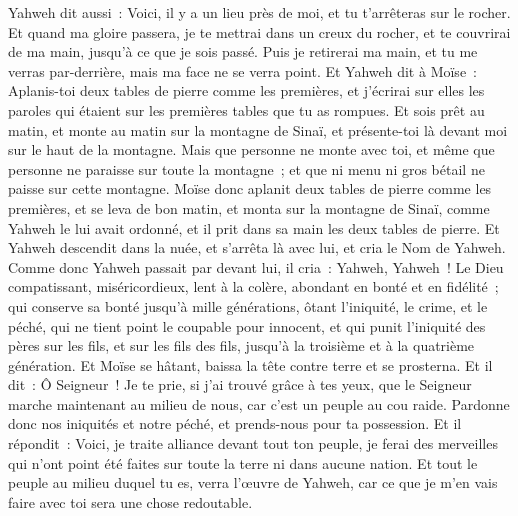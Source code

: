 \begin{multicols}{2}
Yahweh dit aussi~: Voici, il y a un lieu près de moi, et tu t'arrêteras sur le rocher.
Et quand ma gloire passera, je te mettrai dans un creux du rocher, et te couvrirai de ma main, jusqu'à ce que je sois passé.
Puis je retirerai ma main, et tu me verras par-derrière, mais ma face ne se verra point.
\VerseOne{}Et Yahweh dit à Moïse~: Aplanis-toi deux tables de pierre comme les premières, et j'écrirai sur elles les paroles qui étaient sur les premières tables que tu as rompues.
Et sois prêt au matin, et monte au matin sur la montagne de Sinaï, et présente-toi là devant moi sur le haut de la montagne.
Mais que personne ne monte avec toi, et même que personne ne paraisse sur toute la montagne~; et que ni menu ni gros bétail ne paisse sur cette montagne.
Moïse donc aplanit deux tables de pierre comme les premières, et se leva de bon matin, et monta sur la montagne de Sinaï, comme Yahweh le lui avait ordonné, et il prit dans sa main les deux tables de pierre.
Et Yahweh descendit dans la nuée, et s'arrêta là avec lui, et cria le Nom de Yahweh.
Comme donc Yahweh passait par devant lui, il cria~: Yahweh, Yahweh~! Le Dieu compatissant, miséricordieux, lent à la colère, abondant en bonté et en fidélité~;
qui conserve sa bonté jusqu'à mille générations, ôtant l'iniquité, le crime, et le péché, qui ne tient point le coupable pour innocent, et qui punit l'iniquité des pères sur les fils, et sur les fils des fils, jusqu'à la troisième et à la quatrième génération.
Et Moïse se hâtant, baissa la tête contre terre et se prosterna.
Et il dit~: Ô Seigneur~! Je te prie, si j'ai trouvé grâce à tes yeux, que le Seigneur marche maintenant au milieu de nous, car c'est un peuple au cou raide. Pardonne donc nos iniquités et notre péché, et prends-nous pour ta possession.
Et il répondit~: Voici, je traite alliance devant tout ton peuple, je ferai des merveilles qui n'ont point été faites sur toute la terre ni dans aucune nation. Et tout le peuple au milieu duquel tu es, verra l'œuvre de Yahweh, car ce que je m'en vais faire avec toi sera une chose redoutable.

\end{multicols}
